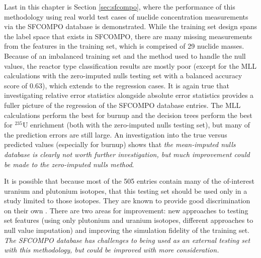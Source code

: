 Last in this chapter is Section \ref{sec:sfcompo}, where the performance of
this methodology using real world test cases of nuclide concentration
measurements via the \gls{SFCOMPO} database is demonstrated.  While the
training set design spans the label space that exists in \gls{SFCOMPO}, there
are many missing measurements from the features in the training set, which is
comprised of 29 nuclide masses.  Because of an imbalanced training set and the
method used to handle the null values, the reactor type classification results
are mostly poor (except for the \gls{MLL} calculations with the zero-imputed
nulls testing set with a balanced accuracy score of 0.63), which extends to the
regression cases. It is again true that investigating relative error statistics
alongside absolute error statistics provides a fuller picture of the regression
of the \gls{SFCOMPO} database entries.  The \gls{MLL} calculations perform the
best for burnup and the decision trees perform the best for ${}^{235}\text{U}$
enrichment (both with the zero-imputed nulls testing set), but many of the
prediction errors are still large. An investigation into the true versus
predicted values (especially for burnup) shows that \textit{the mean-imputed
nulls database is clearly not worth further investigation, but much improvement
could be made to the zero-imputed nulls method}.

It is possible that because most of the 505 entries contain many of the
of-interest uranium and plutonium isotopes, that this testing set should be
used only in a study limited to those isotopes. They are known to provide good
discrimination on their own \cite{pu_discrimination, nicolaou_2006,
nicolaou_pu, nicolaou_2009, nicolaou_2014, nicolaou_2015}.  There are two areas
for improvement: new approaches to testing set features (using only plutonium
and uranium isotopes, different approaches to null value imputation) and
improving the simulation fidelity of the training set. \textit{The
\gls{SFCOMPO} database has challenges to being used as an external testing set
with this methodology, but could be improved with more consideration.}

